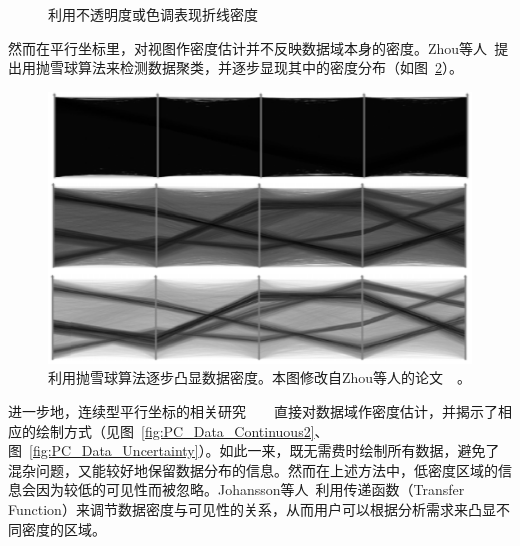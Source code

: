 \documentclass[12pt,twocolumn]{article}
\begin{document}
\begin{figure}[!htb]
\centering
{}
\caption{\label{fig:PC_Design_Density1}利用不透明度或色调表现折线密度}
\end{figure}

然而在平行坐标里，对视图作密度估计并不反映数据域本身的密度。Zhou等人~\citep{zhou2009splatting}提出用抛雪球算法来检测数据聚类，并逐步显现其中的密度分布（如图~\ref{fig:PC_Design_Density2}）。

\begin{figure}[!htb]
\centering
\includegraphics[width=0.8\linewidth]{images/PC_Design_Density3.eps}
\caption{\label{fig:PC_Design_Density2}利用抛雪球算法逐步凸显数据密度。本图修改自Zhou等人的论文~\citep{zhou2009splatting}~。
}
\end{figure}

进一步地，连续型平行坐标的相关研究~\citep{heinrich2009continuous}~\citep{lehmann2011features}~\citep{feng2010matching}~\citep{heinrich2011progressive}直接对数据域作密度估计，并揭示了相应的绘制方式（见图~\ref{fig:PC_Data_Continuous2}、图~\ref{fig:PC_Data_Uncertainty}）。如此一来，既无需费时绘制所有数据，避免了混杂问题，又能较好地保留数据分布的信息。然而在上述方法中，低密度区域的信息会因为较低的可见性而被忽略。Johansson等人~\citep{johansson2005revealing}利用传递函数（Transfer Function）来调节数据密度与可见性的关系，从而用户可以根据分析需求来凸显不同密度的区域。
\end{document}
